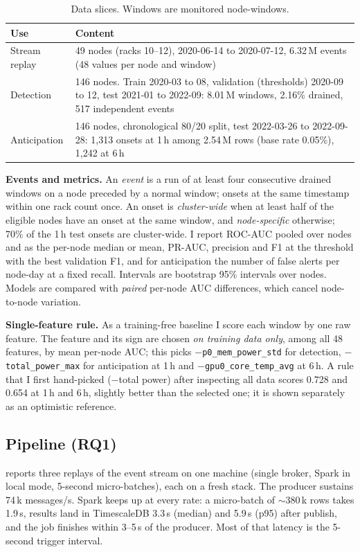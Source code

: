 \begin{table}[t]
\caption{Data slices. Windows are monitored node-windows.}
\label{tab:setup}
\centering\small
\begin{tabular}{p{1.5cm}p{6.3cm}}
\toprule
Use & Content \\
\midrule
Stream replay & 49 nodes (racks 10--12), 2020-06-14 to 2020-07-12, 6.32\,M events (48 values per node and window) \\
Detection & 146 nodes. Train 2020-03 to 08, validation (thresholds) 2020-09 to 12, test 2021-01 to 2022-09: 8.01\,M windows, 2.16\% drained, 517 independent events \\
Anticipation & 146 nodes, chronological 80/20 split, test 2022-03-26 to 2022-09-28: 1,313 onsets at 1\,h among 2.54\,M rows (base rate 0.05\%), 1,242 at 6\,h \\
\bottomrule
\end{tabular}
\end{table}

\textbf{Events and metrics.} An \emph{event} is a run of at least four consecutive drained windows on a node preceded by a normal window; onsets at the same timestamp within one rack count once. An onset is \emph{cluster-wide} when at least half of the eligible nodes have an onset at the same window, and \emph{node-specific} otherwise; 70\% of the 1\,h test onsets are cluster-wide. I report ROC-AUC pooled over nodes and as the per-node median or mean, PR-AUC, precision and F1 at the threshold with the best validation F1, and for anticipation the number of false alerts per node-day at a fixed recall. Intervals are bootstrap 95\% intervals over nodes. Models are compared with \emph{paired} per-node AUC differences, which cancel node-to-node variation.

\textbf{Single-feature rule.} As a training-free baseline I score each window by one raw feature. The feature and its sign are chosen \emph{on training data only}, among all 48 features, by mean per-node AUC; this picks $-$\texttt{p0\_mem\_power\_std} for detection, $-$\texttt{total\_power\_max} for anticipation at 1\,h and $-$\texttt{gpu0\_core\_temp\_avg} at 6\,h. A rule that I first hand-picked ($-$total power) after inspecting all data scores 0.728 and 0.654 at 1\,h and 6\,h, slightly better than the selected one; it is shown separately as an optimistic reference.

\subsection{Pipeline (RQ1)}
\label{sec:pipeline}
 reports three replays of the event stream on one machine (single broker, Spark in local mode, 5-second micro-batches), each on a fresh stack. The producer sustains 74\,k messages/s. Spark keeps up at every rate: a micro-batch of $\sim$380\,k rows takes 1.9\,s, results land in TimescaleDB 3.3\,s (median) and 5.9\,s (p95) after publish, and the job finishes within 3--5\,s of the producer. Most of that latency is the 5-second trigger interval.

